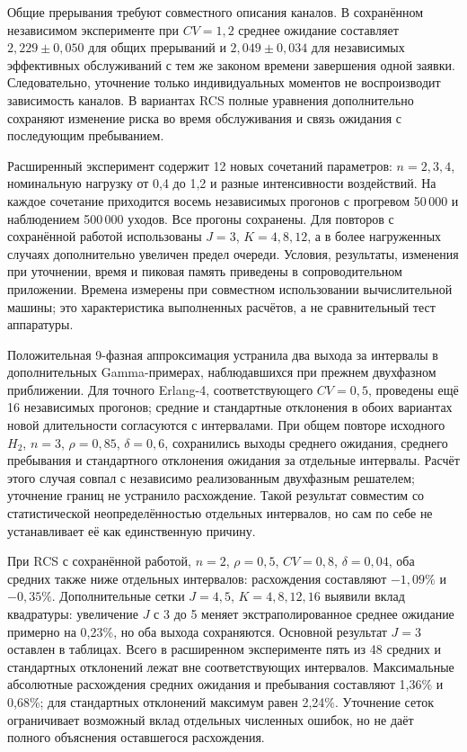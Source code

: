 \documentclass[a4paper,12pt]{article}
\begin{document}
Общие прерывания требуют совместного описания каналов. В сохранённом независимом эксперименте при \(CV=1{,}2\) среднее ожидание составляет \(2{,}229\pm0{,}050\) для общих прерываний и \(2{,}049\pm0{,}034\) для независимых эффективных обслуживаний с тем же законом времени завершения одной заявки. Следовательно, уточнение только индивидуальных моментов не воспроизводит зависимость каналов. В вариантах RCS полные уравнения дополнительно сохраняют изменение риска во время обслуживания и связь ожидания с последующим пребыванием.

Расширенный эксперимент содержит 12 новых сочетаний параметров: \(n=2,3,4\), номинальную нагрузку от 0{,}4 до 1{,}2 и разные интенсивности воздействий. На каждое сочетание приходится восемь независимых прогонов с прогревом 50\,000 и наблюдением 500\,000 уходов. Все прогоны сохранены. Для повторов с сохранённой работой использованы \(J=3\), \(K=4,8,12\), а в более нагруженных случаях дополнительно увеличен предел очереди. Условия, результаты, изменения при уточнении, время и пиковая память приведены в сопроводительном приложении. Времена измерены при совместном использовании вычислительной машины; это характеристика выполненных расчётов, а не сравнительный тест аппаратуры.

Положительная 9-фазная аппроксимация устранила два выхода за интервалы в дополнительных Gamma-примерах, наблюдавшихся при прежнем двухфазном приближении. Для точного Erlang-4, соответствующего \(CV=0{,}5\), проведены ещё 16 независимых прогонов; средние и стандартные отклонения в обоих вариантах новой длительности согласуются с интервалами. При общем повторе исходного \(H_2\), \(n=3\), \(\rho=0{,}85\), \(\delta=0{,}6\), сохранились выходы среднего ожидания, среднего пребывания и стандартного отклонения ожидания за отдельные интервалы. Расчёт этого случая совпал с независимо реализованным двухфазным решателем; уточнение границ не устранило расхождение. Такой результат совместим со статистической неопределённостью отдельных интервалов, но сам по себе не устанавливает её как единственную причину.

При RCS с сохранённой работой, \(n=2\), \(\rho=0{,}5\), \(CV=0{,}8\), \(\delta=0{,}04\), оба средних также ниже отдельных интервалов: расхождения составляют \(-1{,}09\%\) и \(-0{,}35\%\). Дополнительные сетки \(J=4,5\), \(K=4,8,12,16\) выявили вклад квадратуры: увеличение \(J\) с 3 до 5 меняет экстраполированное среднее ожидание примерно на 0{,}23\%, но оба выхода сохраняются. Основной результат \(J=3\) оставлен в таблицах. Всего в расширенном эксперименте пять из 48 средних и стандартных отклонений лежат вне соответствующих интервалов. Максимальные абсолютные расхождения средних ожидания и пребывания составляют 1{,}36\% и 0{,}68\%; для стандартных отклонений максимум равен 2{,}24\%. Уточнение сеток ограничивает возможный вклад отдельных численных ошибок, но не даёт полного объяснения оставшегося расхождения.
\end{document}

